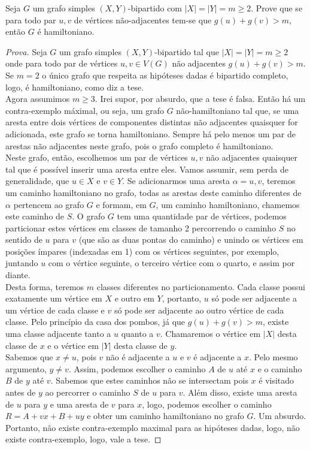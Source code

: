 \documentclass[12pt]{article}
\newenvironment{problem}[2][Ex]{\begin{trivlist}
\item[\hskip \labelsep {\bfseries #1}\hskip \labelsep {\bfseries #2.}]}{\end{trivlist}}
\begin{document}
\begin{problem}{19}
Seja $G$ um grafo simples $(X,Y)$-bipartido com $|X| = |Y| = m \geq 2$. Prove que se para todo par $u, v$ de vértices não-adjacentes tem-se que $g(u) + g(v) > m$, então $G$ é hamiltoniano. \\
\end{problem}

\begin{proof}[Prova]
Seja $G$ um grafo simples $(X,Y)$-bipartido tal que $|X| = |Y| = m \geq 2$ onde para todo par de vértices $u, v \in V(G)$ não adjacentes $g(u) + g(v) > m$. \\
Se $m = 2$ o único grafo que respeita as hipóteses dadas é bipartido completo, logo, é hamiltoniano, como diz a tese. \\
Agora assumimos $m \geq 3$. Irei supor, por absurdo, que a tese é falsa. Então há um contra-exemplo máximal, ou seja, um grafo $G$ não-hamiltoniano tal que, se uma aresta entre dois vértices de componentes distintas não adjacentes quaisquer for adicionada, este grafo se torna hamiltoniano. Sempre há pelo menos um par de arestas não adjacentes neste grafo, pois o grafo completo é hamiltoniano. \\
Neste grafo, então, escolhemos um par de vértices $u,v$ não adjacentes quaisquer tal que é possível inserir uma aresta entre eles. Vamos assumir, sem perda de generalidade, que $u \in X$ e $v \in Y$. Se adicionarmos uma aresta $\alpha = {u,v}$, teremos um caminho hamiltoniano no grafo, todas as arestas deste caminho diferentes de $\alpha$ pertencem ao grafo $G$ e formam, em $G$, um caminho hamiltoniano, chamemos este caminho de $S$. O grafo $G$ tem uma quantidade par de vértices, podemos particionar estes vértices em classes de tamanho 2 percorrendo o caminho $S$ no sentido de $u$ para $v$ (que são as duas pontas do caminho) e unindo os vértices em posições ímpares (indexadas em 1) com os vértices seguintes, por exemplo, juntando $u$ com o vértice seguinte, o terceiro vértice com o quarto, e assim por diante. \\
Desta forma, teremos $m$ classes diferentes no particionamento. Cada classe possui exatamente um vértice em $X$ e outro em $Y$, portanto, $u$ só pode ser adjacente a um vértice de cada classe e $v$ só pode ser adjacente ao outro vértice de cada classe. Pelo princípio da casa dos pombos, já que $g(u) + g(v) > m$, existe uma classe adjacente tanto a $u$ quanto a $v$. Chamaremos o vértice em $|X|$ desta classe de $x$ e o vértice em $|Y|$ desta classe de $y$. \\
Sabemos que $x \neq u$, pois $v$ não é adjacente a $u$ e $v$ é adjacente a $x$. Pelo mesmo argumento, $y \neq v$. Assim, podemos escolher o caminho $A$ de $u$ até $x$ e o caminho $B$ de $y$ até $v$. Sabemos que estes caminhos não se intersectam pois $x$ é visitado antes de $y$ ao percorrer o caminho $S$ de $u$ para $v$. Além disso, existe uma aresta de $u$ para $y$ e uma aresta de $v$ para $x$, logo, podemos escolher o caminho $R = A + vx + B + uy$ e obter um caminho hamiltoniano no grafo $G$. Um absurdo. \\
Portanto, não existe contra-exemplo maximal para as hipóteses dadas, logo, não existe contra-exemplo, logo, vale a tese.
\end{proof}
\end{document}
